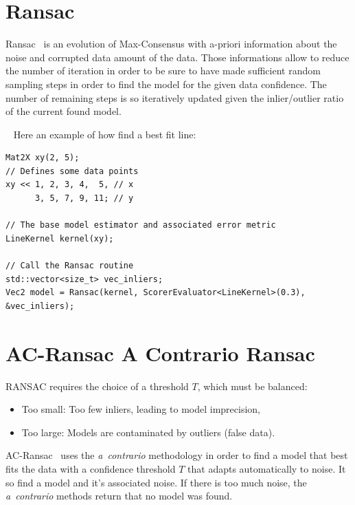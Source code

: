 \documentclass[11pt, letterpaper]{report}
\begin{document}
\newpage
\section{Ransac}
Ransac~\cite{DBLP:journals/cacm/FischlerB81} is an evolution of Max-Consensus with a-priori information about the noise and corrupted data amount of the data. Those informations allow to reduce the number of iteration in order to be sure to have made sufficient random sampling steps in order to find the model for the given data confidence. The number of remaining steps is so iteratively updated given the inlier/outlier ratio of the current found model.

~\newline
Here an example of how find a best fit line:
\vspace{-.5cm}
\begin{lstlisting}
Mat2X xy(2, 5);
// Defines some data points
xy << 1, 2, 3, 4,  5, // x 
      3, 5, 7, 9, 11; // y

// The base model estimator and associated error metric
LineKernel kernel(xy);

// Call the Ransac routine
std::vector<size_t> vec_inliers;
Vec2 model = Ransac(kernel, ScorerEvaluator<LineKernel>(0.3), &vec_inliers);
\end{lstlisting}

\newpage
\section{AC-Ransac A Contrario Ransac}

RANSAC requires the choice of a threshold $T$, which must be balanced:
\begin{itemize}
\item Too small: Too few inliers, leading to model imprecision,
\item Too large: Models are contaminated by outliers (false data).
\end{itemize}

AC-Ransac~\cite{MOULON/ACCV12} uses the \emph{a~contrario} methodology in order to find a model that best fits the data with a confidence threshold $T$ that adapts automatically to noise. It so find a model and it's associated noise. If there is too much noise, the \emph{a~contrario} methods return that no model was found.
\end{document}
